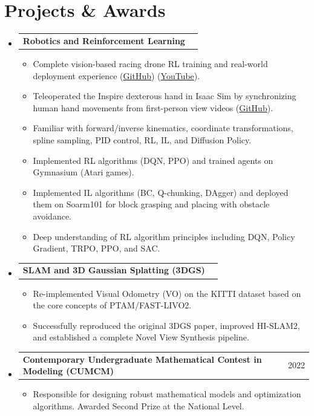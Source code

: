 \documentclass[a4paper,10pt]{article}
\makeatletter
\newcommand{\resumeItem}[1]{\item\small{#1 \vspace{0pt}}}
\newcommand{\resumeProjectHeading}[2]{
  \vspace{-1pt}\item
  \begin{tabular*}{\textwidth}{@{}l@{\extracolsep{\fill}}r@{}}
    \small#1 & #2 \\
  \end{tabular*}\vspace{-1pt}
}
\makeatother
\begin{document}
\section{Projects \& Awards}
  \begin{itemize}[leftmargin=0.15in, label={}]
    \resumeProjectHeading
      {\textbf{Robotics and Reinforcement Learning}}{}
      \begin{itemize}
        \resumeItem{Complete vision-based racing drone RL training and real-world deployment experience (\href{https://github.com/uzh-rpg/VBDF-2025-Team4}{GitHub}) (\href{https://www.youtube.com/watch?v=H1y3LKRlMYc}{YouTube}).}
        \resumeItem{Teleoperated the Inspire dexterous hand in Isaac Sim by synchronizing human hand movements from first-person view videos (\href{https://github.com/JianwenCao/TeleOptHand}{GitHub}).}
        \resumeItem{Familiar with forward/inverse kinematics, coordinate transformations, spline sampling, PID control, RL, IL, and Diffusion Policy.}
        \resumeItem{Implemented RL algorithms (DQN, PPO) and trained agents on Gymnasium (Atari games).}
        \resumeItem{Implemented IL algorithms (BC, Q-chunking, DAgger) and deployed them on Soarm101 for block grasping and placing with obstacle avoidance.}
        \resumeItem{Deep understanding of RL algorithm principles including DQN, Policy Gradient, TRPO, PPO, and SAC.}
      \end{itemize}
      
    \resumeProjectHeading
      {\textbf{SLAM and 3D Gaussian Splatting (3DGS)}}{}
      \begin{itemize}
        \resumeItem{Re-implemented Visual Odometry (VO) on the KITTI dataset based on the core concepts of PTAM/FAST-LIVO2.}
        \resumeItem{Successfully reproduced the original 3DGS paper, improved HI-SLAM2, and established a complete Novel View Synthesis pipeline.}
      \end{itemize}

    \resumeProjectHeading
      {\textbf{Contemporary Undergraduate Mathematical Contest in Modeling (CUMCM)}}{2022}
      \begin{itemize}
        \resumeItem{Responsible for designing robust mathematical models and optimization algorithms. Awarded Second Prize at the National Level.}
      \end{itemize}
  \end{itemize}
  
\end{document}
